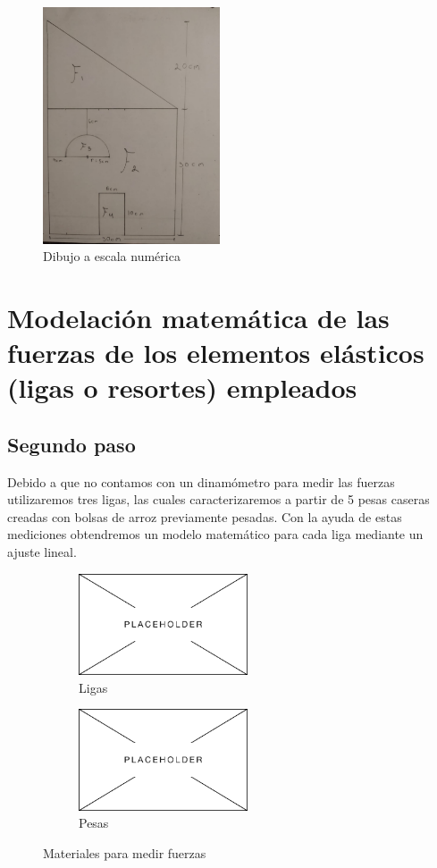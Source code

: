 \documentclass[12pt, titlepage]{report}
\begin{document}
    \begin{figure}[ht]
        \centering
        \includegraphics[height=7cm]{Dibujo.jpg}
        \caption{Dibujo a escala numérica}
    \end{figure}

    \hfill
    \section{Modelación matemática de las fuerzas de los elementos elásticos (ligas o resortes) empleados}
    \subsection*{Segundo paso}
    Debido a que no contamos con un dinamómetro para medir las fuerzas utilizaremos tres ligas, las cuales caracterizaremos a partir de 5 pesas caseras creadas con bolsas de arroz previamente pesadas. Con la ayuda de estas mediciones obtendremos un modelo matemático para cada liga mediante un ajuste lineal.

    \begin{figure}[ht]
        \centering
        \begin{subfigure}[l]{0.4\textwidth}
            \centering
            \includegraphics[height=3cm]{Placeholder.png}
            \caption{Ligas}
        \end{subfigure}
        \begin{subfigure}[3]{0.4\textwidth}
            \centering
            \includegraphics[height=3cm]{Placeholder.png}
            \caption{Pesas}
        \end{subfigure}
        \caption{Materiales para medir fuerzas}
    \end{figure}
    
\end{document}
